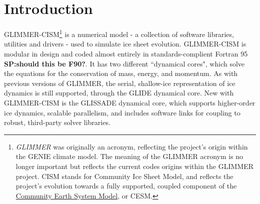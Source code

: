 
\section{Introduction}
%
GLIMMER-CISM\footnote{{\it GLIMMER} was originally an acronym, reflecting the project's origin within the GENIE climate model. The meaning of the GLIMMER acronym is no longer important but reflects the current codes origins within the GLIMMER project. CISM stands for Community Ice Sheet Model, and reflects the project's evolution towards a fully supported, coupled component of the \href{http://www2.cesm.ucar.edu/}{Community Earth System Model}, or CESM.} is a numerical model - a collection of software libraries, utilities and drivers  - used to simulate ice sheet evolution. GLIMMER-CISM is modular in design and coded almost entirely in standards-complient Fortran 95 \textbf{SP:should this be F90?}. It has two different ``dynamical cores", which solve the equations for the conservation of mass, energy, and momentum. As with previous versions of GLIMMER, the serial, shallow-ice representation of ice dynamics is still supported, through the GLIDE dynamical core. New with GLIMMER-CISM is the GLISSADE dynamical core, which supports higher-order ice dynamics, scalable parallelism, and includes software links for coupling to robust, third-party solver libraries. 
%
